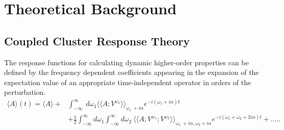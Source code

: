 \section{Theoretical Background}
\subsection{Coupled Cluster Response Theory}
The response functions for calculating dynamic higher-order properties 
can be defined by the frequency dependent coefficients appearing in the 
expansion of the expectation value of an appropriate time-independent 
operator in orders of the perturbation\cite{Koch90}.
\\
\begin{equation}
\begin{split}
\langle A \rangle (t) = \langle A \rangle + & \int_{-\infty}^{\infty}\
d\omega_1{\langle\langle A;V^{\omega_1}\rangle\rangle}_{\omega_1  \
+ i\alpha}e^{-i(\omega_1 + i\alpha)t} \\
& + \frac{1}{2} \int_{-\infty}^{\infty}d\omega_1\int_{-\infty}^{\infty}d\omega_2\
{\langle\langle A;V^{\omega_1};V^{\omega_2}\rangle\rangle}_{\omega_1 \
+ i\alpha,\omega_2 + i\alpha}e^{-i(\omega_1 + \omega_2 + 2i\alpha)t} + .....
\end{split}
\end{equation}
\\

